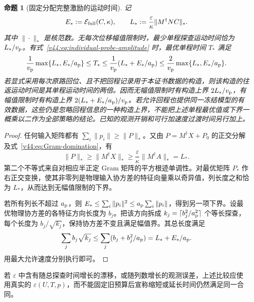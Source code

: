 \documentclass[11pt,a4paper]{article}
\numberwithin{equation}{section}
\newtheorem{proposition}[theorem]{命题}
\theoremstyle{definition}
\begin{document}
\begin{proposition}[固定分配完整激励的运动时间]
\label{v44:prop:probe-time}
记
\begin{equation}
 E_*:=\mathcal E_{\rm full}(C,\kappa),\qquad
 L_*:=\frac{\varepsilon}{\kappa}\|M^\dagger NC\|_*.
\end{equation}
其中 $\|\cdot\|_*$ 是核范数。无每次位移幅值限制时，最少单程探查运动时间恰为 $L_*/v_{\rm p}$。有式~\eqref{v44:eq:individual-probe-amplitude} 时，最优单程时间 $T_*$ 满足
\begin{equation}
 \frac1{v_{\rm p}}\max\{L_*,E_*/a_{\rm p}\}
 \le T_*
 \le\frac1{v_{\rm p}}(L_*+E_*/a_{\rm p})
 \le\frac2{v_{\rm p}}\max\{L_*,E_*/a_{\rm p}\}.
 \label{v44:eq:time-factor-two}
\end{equation}
若显式采用每次原路回位、且不把回程记录用于本证书数据的构造，则该构造的往返运动时间是其单程运动时间的两倍。因而无幅值限制时有构造上界 $2L_*/v_{\rm p}$，有幅值限制时有构造上界 $2(L_*+E_*/a_{\rm p})/v_{\rm p}$。若允许回程也提供同一冻结模型的有效数据，这些仍是忽略回程信息的一种构造上界，不能把上述单程最优值或下界一概乘以二作为全部策略的结论。已知的观测开销和可行加速度过渡时间另行加上。
\end{proposition}

\begin{proof}
任何输入矩阵都有 $\sum_i\|p_i\|\ge\|P\|_*$。又由 $P=M^\dagger X+P_0$ 的正交分解及式~\eqref{v44:eq:Gram-domination}，有
\begin{equation}
 \|P\|_*\ge\|M^\dagger X\|_*
 \ge\frac{\varepsilon}{\kappa}\|M^\dagger A\|_*=L_*.
\end{equation}
第二个不等式来自对相应半正定 Gram 矩阵的平方根迹单调性。对最优矩阵 $P_*$ 作右正交变换，使其非零列是物理输入协方差的特征向量乘以奇异值，列长度之和恰为 $L_*$，从而达到无幅值限制的下界。

若所有列长不超过 $a_{\rm p}$，则
$E_*\le\sum_i\|p_i\|^2\le a_{\rm p}\sum_i\|p_i\|$，得到另一项下界。设最优物理协方差的各特征方向长度为 $b_j$。把该方向拆成 $k_j=\lceil b_j^2/a_{\rm p}^2\rceil$ 个等长探查，每个长度为 $b_j/\sqrt{k_j}$，保持协方差不变且满足幅值界。其总长度满足
\begin{equation}
 \sum_j b_j\sqrt{k_j}
 \le\sum_j(b_j+b_j^2/a_{\rm p})
 =L_*+E_*/a_{\rm p}.
\end{equation}
用最大允许速度分别执行即可。
\end{proof}

若 $\varepsilon$ 中含有随总探查时间增长的漂移，或随列数增长的观测误差，上述比较应使用真实的 $\varepsilon(U,T,p)$，而不能固定旧预算后宣称缩短或延长时间仍然满足同一合同。
\end{document}
